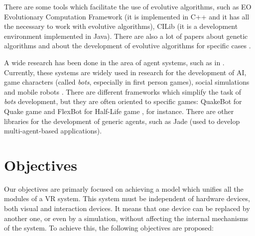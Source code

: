 \documentclass[10pt,journal,letterpaper,compsoc]{IEEEtran}
\begin{document}
There are some tools which facilitate the use of evolutive algorithms, such as EO Evolutionary
Computation Framework \cite{EOECF} (it is implemented in C++ and it has all the necessary to work
with evolutive algorithms), CILib \cite{CILib} (it is a development environment implemented in
Java). There are also a lot of papers about genetic algorithms and about the development of
evolutive algorithms for specific cases \cite{Georgios2004,Chris2007,Robert2005}.

A wide research has been done in the area of agent systems, such as in
\cite{Wooldridge1997,Wood2000}. Currently, these systems are widely used in research for the
development of AI, game characters (called \textit{bots}, especially in first person games), social
simulations and mobile robots \cite{John2007,Kenyon2006}. There are different frameworks which
simplify the task of \textit{bots} development, but they are often oriented to specific games:
QuakeBot for Quake game and FlexBot for Half-Life game \cite{Laird2001,Aaron2002}, for instance.
There are other libraries for the development of generic agents, such as Jade \cite{Jade} (used to
develop multi-agent-based applications).




\section{Objectives
\label{sec:objectives}}

Our objectives are primarly focused on achieving a model which unifies all the modules of a VR
system. This system must be independent of hardware devices, both visual and interaction devices.
It means that one device can be replaced by another one, or even by a simulation, without affecting
the internal mechanisms of the system. To achieve this, the following objectives are proposed:
\end{document}
